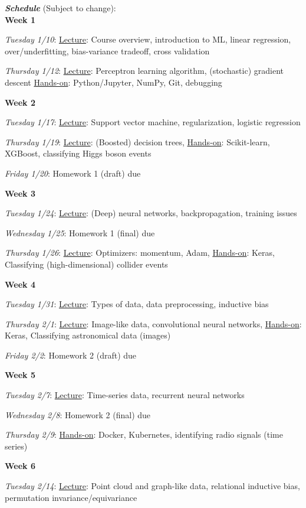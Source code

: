 \documentclass[12pt]{article}
\begin{document}
\noindent\textbf{\emph{Schedule}} (Subject to change):\\

\noindent\textbf{Week 1}

\emph{Tuesday 1/10}: \underline{Lecture}: Course overview, introduction to ML, linear regression, over/underfitting, bias-variance tradeoff, cross validation

\emph{Thursday 1/12}: \underline{Lecture}: Perceptron learning algorithm, (stochastic) gradient descent \underline{Hands-on}: Python/Jupyter, NumPy, Git, debugging

\noindent\textbf{Week 2}

\emph{Tuesday 1/17}: \underline{Lecture}: Support vector machine, regularization, logistic regression

\emph{Thursday 1/19}: \underline{Lecture}: (Boosted) decision trees, \underline{Hands-on}: Scikit-learn, XGBoost, classifying Higgs boson events

\emph{Friday 1/20}: Homework 1 (draft) due

\noindent\textbf{Week 3}

\emph{Tuesday 1/24}: \underline{Lecture}: (Deep) neural networks, backpropagation, training issues

\emph{Wednesday 1/25}: Homework 1 (final) due

\emph{Thursday 1/26}: \underline{Lecture}: Optimizers: momentum, Adam, \underline{Hands-on}: Keras, Classifying (high-dimensional) collider events

\noindent\textbf{Week 4}

\emph{Tuesday 1/31}: \underline{Lecture}: Types of data, data preprocessing, inductive bias

\emph{Thursday 2/1}: \underline{Lecture}: Image-like data, convolutional neural networks, \underline{Hands-on}: Keras, Classifying astronomical data (images)

\emph{Friday 2/2}: Homework 2 (draft) due

\noindent\textbf{Week 5}

\emph{Tuesday 2/7}: \underline{Lecture}: Time-series data, recurrent neural networks

\emph{Wednesday 2/8}: Homework 2 (final) due

\emph{Thursday 2/9}: \underline{Hands-on}: Docker, Kubernetes, identifying radio signals (time series)

\noindent\textbf{Week 6}

\emph{Tuesday 2/14}: \underline{Lecture}: Point cloud and graph-like data, relational inductive bias, permutation invariance/equivariance
\end{document}
